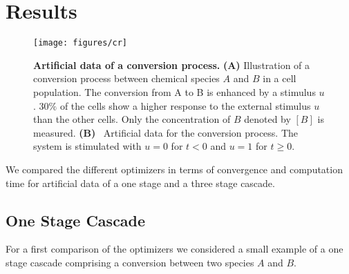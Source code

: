 \documentclass{llncs}
\begin{document}
\section{Results}\label{sec:results}
\begin{figure}[tb]
\centering
\texttt{[image: figures/cr]}
\caption{\textbf{Artificial data of a conversion process.} \textbf{(A)} Illustration of a conversion process between chemical species $A$ and $B$ in a cell population. The conversion from A to B is enhanced by a stimulus $u$. $30\%$ of the cells show a higher response to the external stimulus $u$ than the other cells. Only the concentration of $B$ denoted by $[B]$ is measured. \textbf{(B)}~ Artificial data for the conversion process. The system is stimulated with $u=0$ for $t<0$ and  $u=1$ for $t\geq0$.}\label{fig:cr}
\end{figure}
We compared the different optimizers in terms of convergence and computation time for artificial data of a one stage and a three stage cascade.
\subsection{One Stage Cascade}
For a first comparison of the optimizers we considered a small example of a one stage cascade comprising a conversion between two species $A$ and $B$.
\end{document}
